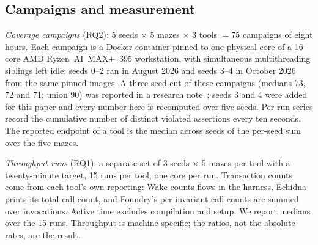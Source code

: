 \documentclass[11pt,a4paper]{article}
\newcommand{\wake}{Wake}
\begin{document}
\subsection{Campaigns and measurement}
\label{sec:campaigns}

\emph{Coverage campaigns} (RQ2): 5 seeds $\times$ 5 mazes $\times$ 3 tools $=75$ campaigns of eight hours. Each campaign is a Docker container pinned to one physical core of a 16-core AMD Ryzen~AI~MAX+~395 workstation, with simultaneous multithreading siblings left idle; seeds 0--2 ran in August 2026 and seeds 3--4 in October 2026 from the same pinned images. A three-seed cut of these campaigns (medians 73, 72 and 71; union 90) was reported in a research note~\cite{prevratil2026fuzzers}; seeds 3 and 4 were added for this paper and every number here is recomputed over five seeds. Per-run series record the cumulative number of distinct violated assertions every ten seconds. The reported endpoint of a tool is the median across seeds of the per-seed sum over the five mazes.

\emph{Throughput runs} (RQ1): a separate set of 3 seeds $\times$ 5 mazes per tool with a twenty-minute target, 15 runs per tool, one core per run. Transaction counts come from each tool's own reporting: \wake{} counts flows in the harness, Echidna prints its total call count, and Foundry's per-invariant call counts are summed over invocations. Active time excludes compilation and setup. We report medians over the 15 runs. Throughput is machine-specific; the ratios, not the absolute rates, are the result.
\end{document}

